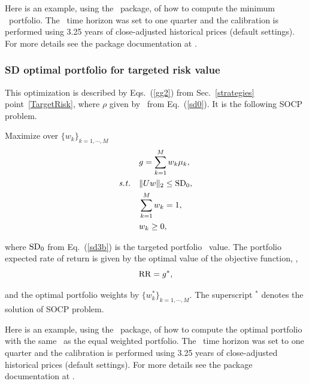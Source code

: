 \bigskip
\noindent Here is an example, using the \azapy\ package, of how to compute the minimum \SD\ portfolio.
The \SD\ time horizon was set to one quarter and the calibration is performed using 3.25 years of
close-adjusted historical prices (default settings).
For more details see the package documentation at \azapydoc.



\BackToContents


\subsubsection{SD optimal portfolio for targeted risk value}
This optimization is described by Eqs.~(\ref{gg2}) from Sec.~\ref{strategies} point~\ref{TargetRisk},
where $\rho$ given by \SD\ from Eq.\ (\ref{sd0}).
It is the following SOCP problem.

\bigskip
\noindent Maximize over $\{ w_k \}_{k=1,\cdots, M}$
\begin{subequations}\label{sd3}
\begin{align}
    & g = \sum_{k=1}^M w_k \mu_k, \label{sd3a} \\
    \st & \| U w\|_2 \leq \SD_0, \label{sd3b} \\
        & \sum_{k=1}^M w_k = 1, \label{sd3c} \\
        & w_k \geq 0, \label{sd3d}
\end{align}
\end{subequations}

\noindent where ${\rm SD}_0$ from Eq.~(\ref{sd3b}) is the targeted portfolio \SD\ value.
The portfolio expected rate of return is given by the optimal value of the objective
function, \ie,
\begin{equation}
    \RR = g^*, \label{sd4}
\end{equation}

\noindent and the optimal portfolio weights by $\{w^*_k\}_{k=1,\cdots,M}$. The superscript $^*$ denotes the
solution of SOCP problem.


\bigskip
\noindent Here is an example, using the \azapy\ package, of how to compute the optimal portfolio
with the same \SD\ as the equal weighted portfolio.
The \SD\ time horizon was set to one quarter and the calibration is performed using 3.25 years of
close-adjusted historical prices (default settings).
For more details see the package documentation at \azapydoc.



